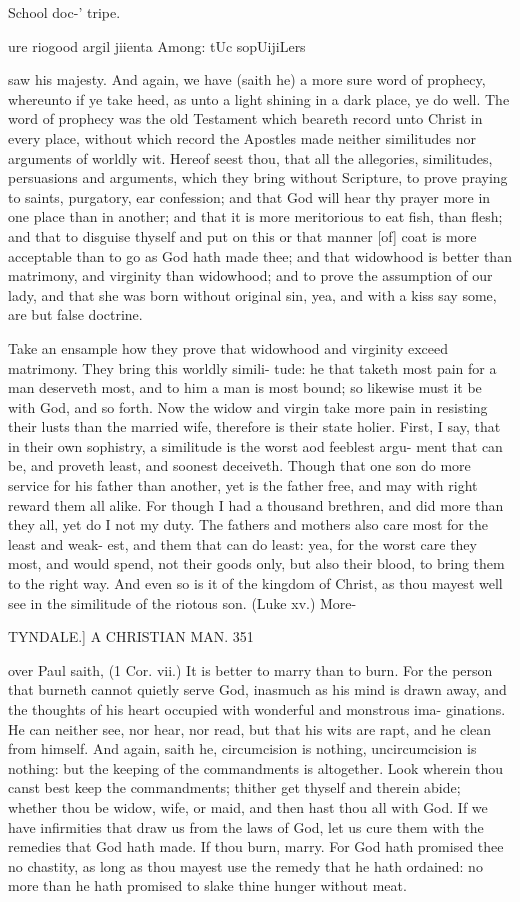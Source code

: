 \documentclass{custom}
\begin{document}
{School doc-' 
tripe. 

ure riogood 
argil jiienta 
Among: tUc 
sopUijiLers 

saw his majesty. And again, we have (saith he) a more 
sure word of prophecy, whereunto if ye take heed, as 
unto a light shining in a dark place, ye do well. The 
word of prophecy was the old Testament which beareth 
record unto Christ in every place, without which record 
the Apostles made neither similitudes nor arguments of 
worldly wit. Hereof seest thou, that all the allegories, 
similitudes, persuasions and arguments, which they bring 
without Scripture, to prove praying to saints, purgatory, 
ear confession; and that God will hear thy prayer more 
in one place than in another; and that it is more meritorious 
to eat fish, than flesh; and that to disguise thyself and put 
on this or that manner [of] coat is more acceptable than to go 
as God hath made thee; and that widowhood is better than 
matrimony, and virginity than widowhood; and to prove 
the assumption of our lady, and that she was born without 
original sin, yea, and with a kiss say some, are but false 
doctrine. 

Take an ensample how they prove that widowhood and 
virginity exceed matrimony. They bring this worldly simili- 
tude: he that taketh most pain for a man deserveth 
most, and to him a man is most bound; so likewise must 
it be with God, and so forth. Now the widow and virgin 
take more pain in resisting their lusts than the married wife, 
therefore is their state holier. First, I say, that in their 
own sophistry, a similitude is the worst aod feeblest argu- 
ment that can be, and proveth least, and soonest deceiveth. 
Though that one son do more service for his father than 
another, yet is the father free, and may with right reward 
them all alike. For though I had a thousand brethren, 
and did more than they all, yet do I not my duty. The 
fathers and mothers also care most for the least and weak- 
est, and them that can do least: yea, for the worst care 
they most, and would spend, not their goods only, but also 
their blood, to bring them to the right way. And even so 
is it of the kingdom of Christ, as thou mayest well see in 
the similitude of the riotous son. (Luke xv.) More- 


TYNDALE.] A CHRISTIAN MAN. 351

over Paul saith, (1 Cor. vii.) It is better to marry than 
to burn. For the person that burneth cannot quietly serve 
God, inasmuch as his mind is drawn away, and the thoughts 
of his heart occupied with wonderful and monstrous ima- 
ginations. He can neither see, nor hear, nor read, but 
that his wits are rapt, and he clean from himself. And 
again, saith he, circumcision is nothing, uncircumcision is 
nothing: but the keeping of the commandments is altogether. 
Look wherein thou canst best keep the commandments; 
thither get thyself and therein abide; whether thou be 
widow, wife, or maid, and then hast thou all with God.
If we have infirmities that draw us from the laws of God,
let us cure them with the remedies that God hath made.
If thou burn, marry. For God hath promised thee no
chastity, as long as thou mayest use the remedy that he
hath ordained: no more than he hath promised to slake
thine hunger without meat.

}
\end{document}
